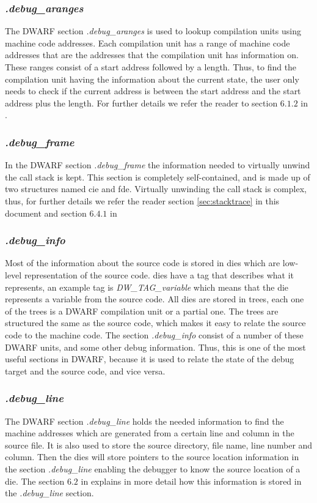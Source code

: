 \subsubsection{\emph{.debug\_aranges}}
The \gls{DWARF} section \emph{.debug\_aranges} is used to lookup compilation units using machine code addresses.
Each compilation unit has a range of machine code addresses that are the addresses that the compilation unit has information on.
These ranges consist of a start address followed by a length.
Thus, to find the compilation unit having the information about the current state, the user only needs to check if the current address is between the start address and the start address plus the length.
For further details we refer the reader to section $6.1.2$ in \cite{dwarf}.


\subsubsection{\emph{.debug\_frame}}
In the \gls{DWARF} section \emph{.debug\_frame} the information needed to virtually unwind the call stack is kept.
This section is completely self-contained, and is made up of two structures named \acrfull{cie} and \acrfull{fde}.
Virtually unwinding the call stack is complex, thus, for further details we refer the reader section \ref{sec:stacktrace} in this document and section $6.4.1$ in \cite{dwarf}


\subsubsection{\emph{.debug\_info}}
Most of the information about the source code is stored in \glspl{die} which are low-level representation of the source code.
\glspl{die} have a tag that describes what it represents, an example tag is \emph{DW\_TAG\_variable} which means that the \gls{die} represents a variable from the source code.
All \glspl{die} are stored in trees, each one of the trees is a \gls{DWARF} compilation unit or a partial one.
The trees are structured the same as the source code, which makes it easy to relate the source code to the machine code.
The section \emph{.debug\_info} consist of a number of these \gls{DWARF} units, and some other debug information.
Thus, this is one of the most useful sections in \gls{DWARF}, because it is used to relate the state of the debug target and the source code, and vice versa.


\subsubsection{\emph{.debug\_line}}
The \gls{DWARF} section \emph{.debug\_line} holds the needed information to find the machine addresses which are generated from a certain line and column in the source file.
It is also used to store the source directory, file name, line number and column.
Then the \glspl{die} will store pointers to the source location information in the section \emph{.debug\_line} enabling the debugger to know the source location of a \gls{die}.
The section $6.2$ in \cite{dwarf} explains in more detail how this information is stored in the \emph{.debug\_line} section.


